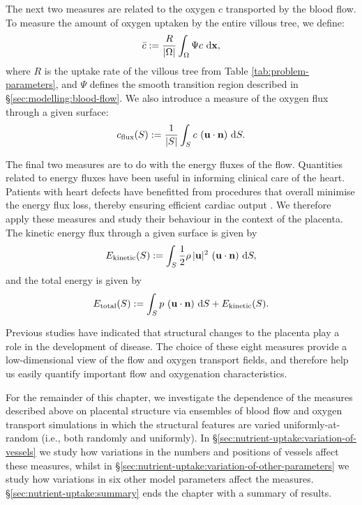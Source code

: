         The next two measures are related to the oxygen $c$ transported by the blood flow. To measure the amount of oxygen uptaken by the entire villous tree, we define:
        \begin{equation}
            \bar{c} := \frac{R}{|\Omega|} \int_\Omega \Psi c ~\mathrm{d} \boldsymbol{\mathbf{x}},
            \label{eq:eff-c}
        \end{equation}
        where $R$ is the uptake rate of the villous tree from Table \ref{tab:problem-parameters}, and $\Psi$ defines the smooth transition region described in \S\ref{sec:modelling:blood-flow}. We also introduce a measure of the oxygen flux through a given surface:
        \begin{equation}
            c_\text{flux}(S) := \frac{1}{|S|} \int_S c ~ (\boldsymbol{\mathbf{u}} \cdot \boldsymbol{\mathbf{n}}) ~\mathrm{d} S.
            \label{eq:eff-c-flux}
        \end{equation}
        
        The final two measures are to do with the energy fluxes of the flow. Quantities related to energy fluxes have been useful in informing clinical care of the heart. Patients with heart defects have benefitted from procedures that overall minimise the energy flux loss, thereby ensuring efficient cardiac output \cite{rijnbergEnergeticsBloodFlow2018,whiteheadNonlinearPowerLoss2007}. We therefore apply these measures and study their behaviour in the context of the placenta. The kinetic energy flux through a given surface is given by
        \begin{equation}
            E_\text{kinetic}(S) := \int_S \frac{1}{2} \rho \, |\boldsymbol{\mathbf{u}}|^2 ~ (\boldsymbol{\mathbf{u}} \cdot \boldsymbol{\mathbf{n}}) ~\mathrm{d} S,
            \label{eq:eff-e-kinetic}
        \end{equation}
        and the total energy is given by
        \begin{equation}
            E_\text{total}(S) := \int_S p ~ (\boldsymbol{\mathbf{u}} \cdot \boldsymbol{\mathbf{n}}) ~\mathrm{d} S + E_\text{kinetic}(S).
            \label{eq:eff-e-total}
        \end{equation}

        Previous studies have indicated that structural changes to the placenta play a role in the development of disease. The choice of these eight measures provide a low-dimensional view of the flow and oxygen transport fields, and therefore help us easily quantify important flow and oxygenation characteristics.
        
        For the remainder of this chapter, we investigate the dependence of the measures described above on placental structure via ensembles of blood flow and oxygen transport simulations in which the structural features are varied uniformly-at-random (i.e., both randomly and uniformly). In \S\ref{sec:nutrient-uptake:variation-of-vessels} we study how variations in the numbers and positions of vessels affect these measures, whilst in \S\ref{sec:nutrient-uptake:variation-of-other-parameters} we study how variations in six other model parameters affect the measures. \S\ref{sec:nutrient-uptake:summary} ends the chapter with a summary of results.
    
